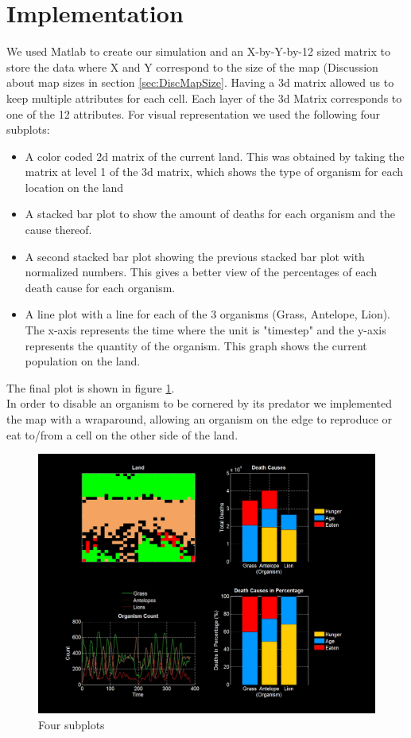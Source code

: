 \documentclass[11pt]{article}
\begin{document}
\section{Implementation}
We used Matlab to create our simulation and an X-by-Y-by-12 sized matrix to store the data where X and Y correspond to the size of the map (Discussion about map sizes in section \ref{sec:DiscMapSize}. Having a 3d matrix allowed us to keep multiple attributes for each cell. Each layer of the 3d Matrix corresponds to one of the 12 attributes. For visual representation we used the following four subplots:
\begin{itemize}
\item A color coded 2d matrix of the current land. This was obtained by taking the matrix at level 1 of the 3d matrix, which shows the type of organism for each location on the land
\item A stacked bar plot to show the amount of deaths for each organism and the cause thereof.
\item  A second stacked bar plot showing the previous stacked bar plot with normalized numbers. This gives a better view of the percentages of each death cause for each organism. 
\item A line plot with a line for each of the 3 organisms (Grass, Antelope, Lion). The x-axis represents the time where the unit is "timestep" and the y-axis represents the quantity of the organism. This graph shows the current population on the land.
\end{itemize}
The final plot is shown in figure \ref{fig:plotScreenshot}.\\
In order to disable an organism to be cornered by its predator we implemented the map with a wraparound, allowing an organism on the edge to reproduce or eat to/from a cell on the other side of the land. 
\begin{figure}
\includegraphics[scale=0.35]{plotScreenshot.png}
\caption{Four subplots}
\label{fig:plotScreenshot}
\end{figure}
\end{document}

